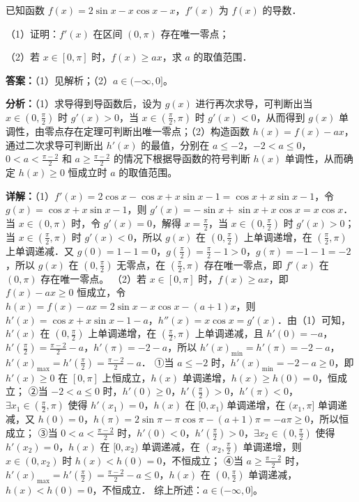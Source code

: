 \begin{question}[points=12]
已知函数 $f(x) = 2\sin x - x\cos x - x$，$f'(x)$ 为 $f(x)$ 的导数．

（1）证明：$f'(x)$ 在区间 $(0,\pi)$ 存在唯一零点；

（2）若 $x \in [0,\pi]$ 时，$f(x) \ge ax$，求 $a$ 的取值范围．
\begin{solution}
\textbf{答案：}（1）见解析；（2）$a \in (-\infty, 0]$。

\textbf{分析：}（1）求导得到导函数后，设为 $g(x)$ 进行再次求导，可判断出当 $x \in (0,\frac{\pi}{2})$ 时 $g'(x)>0$，当 $x \in (\frac{\pi}{2},\pi)$ 时 $g'(x)<0$，从而得到 $g(x)$ 单调性，由零点存在定理可判断出唯一零点；（2）构造函数 $h(x)=f(x)-ax$，通过二次求导可判断出 $h'(x)$ 的最值，分别在 $a \le -2$，$-2<a\le0$，$0<a<\frac{\pi-2}{2}$ 和 $a \ge \frac{\pi-2}{2}$ 的情况下根据导函数的符号判断 $h(x)$ 单调性，从而确定 $h(x)\ge0$ 恒成立时 $a$ 的取值范围。

\textbf{详解：}（1）$f'(x)=2\cos x - \cos x + x\sin x -1 = \cos x + x\sin x -1$，令 $g(x)=\cos x + x\sin x -1$，则 $g'(x)=-\sin x + \sin x + x\cos x = x\cos x$．当 $x \in (0,\pi)$ 时，令 $g'(x)=0$，解得 $x=\frac{\pi}{2}$，当 $x\in(0,\frac{\pi}{2})$ 时 $g'(x)>0$；当 $x\in(\frac{\pi}{2},\pi)$ 时 $g'(x)<0$，所以 $g(x)$ 在 $(0,\frac{\pi}{2})$ 上单调递增，在 $(\frac{\pi}{2},\pi)$ 上单调递减．又 $g(0)=1-1=0$，$g(\frac{\pi}{2})=\frac{\pi}{2}-1>0$，$g(\pi)=-1-1=-2$，所以 $g(x)$ 在 $(0,\frac{\pi}{2})$ 无零点，在 $(\frac{\pi}{2},\pi)$ 存在唯一零点，即 $f'(x)$ 在 $(0,\pi)$ 存在唯一零点。
（2）若 $x\in[0,\pi]$ 时，$f(x)\ge ax$，即 $f(x)-ax\ge0$ 恒成立，令 $h(x)=f(x)-ax=2\sin x - x\cos x - (a+1)x$，则 $h'(x)=\cos x + x\sin x -1 - a$，$h''(x)=x\cos x = g'(x)$．由（1）可知，$h'(x)$ 在 $(0,\frac{\pi}{2})$ 上单调递增，在 $(\frac{\pi}{2},\pi)$ 上单调递减，且 $h'(0)=-a$，$h'(\frac{\pi}{2})=\frac{\pi-2}{2}-a$，$h'(\pi)=-2-a$，所以 $h'(x)_{\min}=h'(\pi)=-2-a$，$h'(x)_{\max}=h'(\frac{\pi}{2})=\frac{\pi-2}{2}-a$．
①当 $a\le -2$ 时，$h'(x)_{\min}=-2-a\ge0$，即 $h'(x)\ge0$ 在 $[0,\pi]$ 上恒成立，$h(x)$ 单调递增，$h(x)\ge h(0)=0$，恒成立；
②当 $-2<a\le0$ 时，$h'(0)\ge0$，$h'(\frac{\pi}{2})>0$，$h'(\pi)<0$，$\exists x_1\in(\frac{\pi}{2},\pi)$ 使得 $h'(x_1)=0$，$h(x)$ 在 $[0,x_1)$ 单调递增，在 $(x_1,\pi]$ 单调递减，又 $h(0)=0$，$h(\pi)=2\sin \pi - \pi\cos \pi - (a+1)\pi = -a\pi \ge 0$，所以恒成立；
③当 $0<a<\frac{\pi-2}{2}$ 时，$h'(0)<0$，$h'(\frac{\pi}{2})>0$，$\exists x_2\in(0,\frac{\pi}{2})$ 使得 $h'(x_2)=0$，$h(x)$ 在 $[0,x_2)$ 单调递减，在 $(x_2,\frac{\pi}{2})$ 单调递增，则 $x\in(0,x_2)$ 时 $h(x)<h(0)=0$，不恒成立；
④当 $a\ge \frac{\pi-2}{2}$ 时，$h'(x)_{\max}=h'(\frac{\pi}{2})=\frac{\pi-2}{2}-a\le0$，$h(x)$ 在 $(0,\frac{\pi}{2})$ 单调递减，$h(x)<h(0)=0$，不恒成立．
综上所述：$a\in(-\infty,0]$。
\end{solution}
\end{question}

